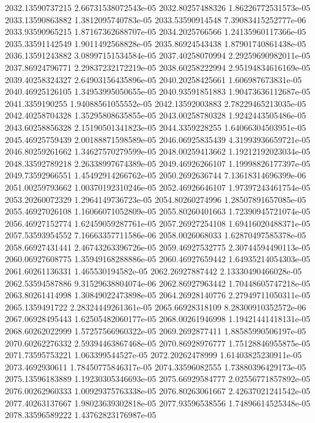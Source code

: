 {2032.13590737215 2.66731538072543e-05
2032.80257488326 1.86226772531573e-05
2033.13590863882 1.3812095740783e-05
2033.53590914548 7.39083415252777e-06
2033.93590965215 1.87167362688707e-05
2034.2025766566 1.24135960117366e-05
2035.33591142549 1.9011492568828e-05
2035.86924543438 1.87901740861438e-05
2036.13591243882 3.08997151534584e-05
2037.40258070994 2.29259690982011e-05
2037.86924796771 2.29837232172219e-05
2038.60258222994 2.95194834616169e-05
2039.40258324327 2.64903156435896e-05
2040.20258425661 1.606987673831e-05
2040.46925126105 1.34953995050655e-05
2040.93591851883 1.90473636112687e-05
2041.3359190255 1.94088561055552e-05
2042.13592003883 2.78229465213035e-05
2042.40258704328 1.35295808635855e-05
2043.00258780328 1.9242443505486e-05
2043.60258856328 2.15190501341823e-05
2044.3359228255 1.64066304503951e-05
2045.46925759439 2.00188871598589e-05
2046.06925835439 4.31993936659721e-05
2046.80259261662 1.34627570279599e-05
2048.00259413662 1.19212192023034e-05
2048.33592789218 2.26338997674389e-05
2049.46926266107 1.19998826177397e-05
2049.73592966551 1.45492914266762e-05
2050.2692636744 7.13618314696399e-06
2051.00259793662 1.00370192310246e-05
2052.46926646107 1.97397243461754e-05
2053.20260072329 1.2964149736723e-05
2054.80260274996 1.28507891657085e-05
2055.46927026108 1.16066071052809e-05
2055.80260401663 1.72390945721074e-05
2056.46927152774 1.62459059287761e-05
2057.26927254108 1.69416020488371e-05
2057.53593954552 7.16663357711586e-06
2058.0026068033 1.62870497585378e-05
2058.66927431441 2.46743263396726e-05
2059.46927532775 2.30744594490113e-05
2060.06927608775 1.35949168288886e-05
2060.46927659442 1.64935214054303e-05
2061.60261136331 1.465530194582e-05
2062.26927887442 2.13330490466028e-05
2062.53594587886 9.31529638804074e-06
2062.86927963442 1.70448605747218e-05
2063.80261414998 1.30849022473898e-05
2064.26928140776 2.27949711050311e-05
2065.1359491722 2.28324449261361e-05
2065.66928318109 8.28300910352572e-06
2067.06928495443 1.62505482060177e-05
2068.00261946998 1.19421441418131e-05
2068.60262022999 1.57257566960322e-05
2069.2692877411 1.88585990506197e-05
2070.60262276332 2.59394463867468e-05
2070.86928976777 1.75128846955875e-05
2071.73595753221 1.063399544527e-05
2072.20262478999 1.61403825230911e-05
2073.4692930611 1.78450775846317e-05
2074.33596082555 1.73880396429173e-05
2075.13596183889 1.19230305346693e-05
2075.66929584777 2.02556771857892e-05
2076.00262960333 1.00929375763338e-05
2076.80263061667 2.42637021241542e-05
2077.40263137667 1.98023639302818e-05
2077.93596538556 1.74896614525348e-05
2078.33596589222 1.43762823176987e-05
}
